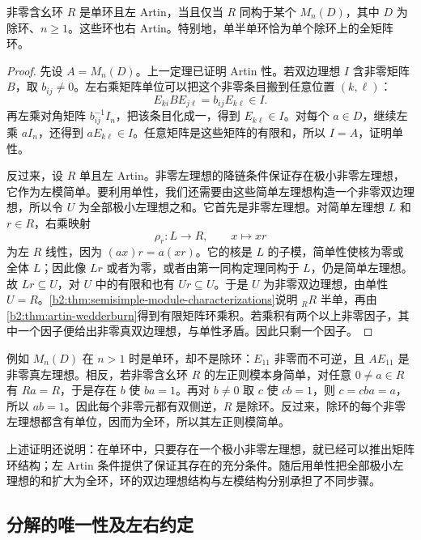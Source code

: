 \begin{proposition}\label{b2:prop:simple-artinian}
	非零含幺环 \(R\) 是单环且左 Artin，当且仅当 \(R\) 同构于某个 \(M_n(D)\)，其中 \(D\) 为除环、\(n\ge1\)。这些环也右 Artin。特别地，单半单环恰为单个除环上的全矩阵环。
\end{proposition}
\begin{proof}
	先设 \(A=M_n(D)\)。上一定理已证明 Artin 性。若双边理想 \(I\) 含非零矩阵 \(B\)，取 \(b_{ij}\ne0\)。左右乘矩阵单位可以把这个非零条目搬到任意位置 \((k,\ell)\)：
	\[
		E_{ki}BE_{j\ell}=b_{ij}E_{k\ell}\in I.
	\]
	再左乘对角矩阵 \(b_{ij}^{-1}I_n\)，把该条目化成一，得到 \(E_{k\ell}\in I\)。对每个 \(a\in D\)，继续左乘 \(aI_n\)，还得到 \(aE_{k\ell}\in I\)。任意矩阵是这些矩阵的有限和，所以 \(I=A\)，证明单性。

	反过来，设 \(R\) 单且左 Artin。非零左理想的降链条件保证存在极小非零左理想，它作为左模简单。要利用单性，我们还需要由这些简单左理想构造一个非零双边理想，所以令 \(U\) 为全部极小左理想之和。它首先是非零左理想。对简单左理想 \(L\) 和 \(r\in R\)，右乘映射
	\[
		\rho_r:L\longrightarrow R,\qquad x\longmapsto xr
	\]
	为左 \(R\) 线性，因为 \((ax)r=a(xr)\)。它的核是 \(L\) 的子模，简单性使核为零或全体 \(L\)；因此像 \(Lr\) 或者为零，或者由第一同构定理同构于 \(L\)，仍是简单左理想。故 \(Lr\subseteq U\)，对 \(U\) 中的有限和也有 \(Ur\subseteq U\)。于是 \(U\) 为非零双边理想，由单性 \(U=R\)。\cref{b2:thm:semisimple-module-characterizations}说明 \({}_RR\) 半单，再由\cref{b2:thm:artin-wedderburn}得到有限矩阵环乘积。若乘积有两个以上非零因子，其中一个因子便给出非零真双边理想，与单性矛盾。因此只剩一个因子。
\end{proof}

例如 \(M_n(D)\) 在 \(n>1\) 时是单环，却不是除环：\(E_{11}\) 非零而不可逆，且 \(AE_{11}\) 是非零真左理想。相反，若非零含幺环 \(R\) 的左正则模本身简单，对任意 \(0\ne a\in R\) 有 \(Ra=R\)，于是存在 \(b\) 使 \(ba=1\)。再对 \(b\ne0\) 取 \(c\) 使 \(cb=1\)，则 \(c=cba=a\)，所以 \(ab=1\)。因此每个非零元都有双侧逆，\(R\) 是除环。反过来，除环的每个非零左理想都含有单位，因而为全环，所以其左正则模简单。

\ProseParagraphBreak
上述证明还说明：在单环中，只要存在一个极小非零左理想，就已经可以推出矩阵环结构；左 Artin 条件提供了保证其存在的充分条件。随后用单性把全部极小左理想的和扩大为全环，环的双边理想结构与左模结构分别承担了不同步骤。

\subsection{分解的唯一性及左右约定}
\label{b2:subsec:1303:03}


